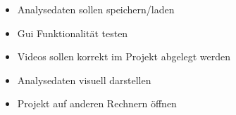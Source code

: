 \documentclass[]{book}
\begin{document}
\begin{itemize}
\item Analysedaten sollen speichern/laden
\item Gui Funktionalität testen
\item Videos sollen korrekt im Projekt abgelegt werden
\item Analysedaten visuell darstellen
\item Projekt auf anderen Rechnern öffnen
\end{itemize}
\end{document}
